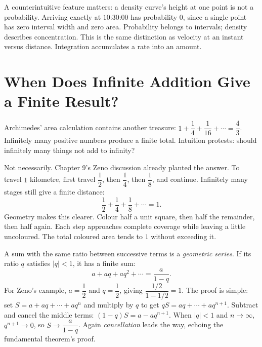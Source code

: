 A counterintuitive feature matters: a density curve's height at one point is not a probability. Arriving exactly at $10$:$30$:$00$ has probability $0$, since a single point has zero interval width and zero area. Probability belongs to intervals; density describes concentration. This is the same distinction as velocity at an instant versus distance. Integration accumulates a rate into an amount.

\section{When Does Infinite Addition Give a Finite Result?}

Archimedes' area calculation contains another treasure: $1+\dfrac14+\dfrac1{16}+\cdots=\dfrac43$. Infinitely many positive numbers produce a finite total. Intuition protests: should infinitely many things not add to infinity?

Not necessarily. Chapter 9's Zeno discussion already planted the answer. To travel $1$ kilometre, first travel $\dfrac12$, then $\dfrac14$, then $\dfrac18$, and continue. Infinitely many stages still give a finite distance:
\[
\frac12+\frac14+\frac18+\cdots=1.
\]
Geometry makes this clearer. Colour half a unit square, then half the remainder, then half again. Each step approaches complete coverage while leaving a little uncoloured. The total coloured area tends to $1$ without exceeding it.

\begin{center}
\end{center}

A sum with the same ratio between successive terms is a \emph{geometric series}. If its ratio $q$ satisfies $|q|<1$, it has a finite sum:
\[
a+aq+aq^{2}+\cdots=\frac{a}{1-q}.
\]
For Zeno's example, $a=\dfrac12$ and $q=\dfrac12$, giving $\dfrac{1/2}{1-1/2}=1$. The proof is simple: set $S=a+aq+\cdots+aq^{n}$ and multiply by $q$ to get $qS=aq+\cdots+aq^{n+1}$. Subtract and cancel the middle terms: $(1-q)S=a-aq^{n+1}$. When $|q|<1$ and $n\to\infty$, $q^{n+1}\to 0$, so $S\to\dfrac{a}{1-q}$. Again \emph{cancellation} leads the way, echoing the fundamental theorem's proof.

